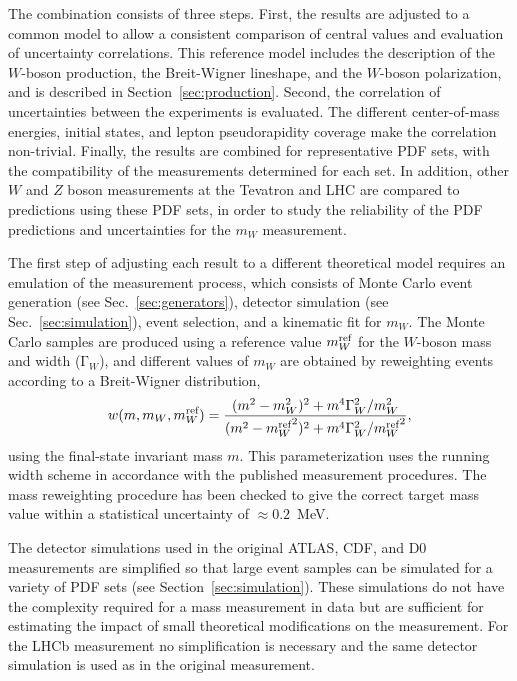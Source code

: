 
The combination consists of three steps.  First, the results are adjusted to a common model to allow 
a consistent comparison of central values and evaluation of uncertainty correlations.  This reference
model includes the description of the $W$-boson production, the Breit-Wigner lineshape, and the $W$-boson
polarization, and is described in Section~\ref{sec:production}.  Second, the correlation of
uncertainties between the experiments is evaluated.  The different center-of-mass energies, initial states,
and lepton pseudorapidity coverage make the correlation non-trivial.
Finally, the results are combined for representative PDF sets, with the compatibility of the measurements
determined for each set.  In addition, other $W$ and $Z$ boson measurements at the Tevatron and LHC are
compared to predictions using these PDF sets, in order to study the reliability of the PDF predictions and
uncertainties for the $m_W$ measurement.

The first step of adjusting each result to a different theoretical model requires an emulation of the 
measurement process, which consists of Monte Carlo event generation (see Sec.~\ref{sec:generators}), detector
simulation (see Sec.~\ref{sec:simulation}), event selection, and a kinematic fit for $m_W$.  The Monte Carlo
samples are produced using a reference value $m_W^{\scriptsize\textrm{ref}}$ for the $W$-boson mass and width
(${\mathrm \Gamma}_W$), and different values of $m_W$ are obtained by reweighting events according to a Breit-Wigner
distribution,
\begin{equation}
  w(m,m_W,m_W^{\scriptsize\textrm{ref}}) = \frac{(m^2 - m_W^2)^2 + m^4 {\mathrm \Gamma}_W^2 / m_W^2} 
{(m^2 - {m_W^{\scriptsize\textrm{ref}}}^2)^2 + m^4 {\mathrm \Gamma}_W^2 /   {m_W^{\scriptsize\textrm{ref}}}^2},
\end{equation}
using the final-state invariant mass $m$.  
This parameterization uses the running width scheme in accordance with 
the published measurement procedures.  The mass reweighting procedure has been checked to give the 
correct target mass value within a statistical uncertainty of $\approx 0.2$~MeV.

The detector simulations used in the original ATLAS, CDF, and D0 measurements are simplified so that
large event samples can be simulated for a variety of PDF sets (see Section~\ref{sec:simulation}).
These simulations do not have the complexity required for a mass measurement in data but are sufficient
for estimating the impact of small theoretical modifications on the measurement.  For the LHCb measurement
no simplification is necessary and the same detector simulation is used as in the original measurement.

